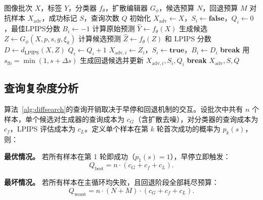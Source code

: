 \documentclass[type=bachelor,oneside]{fduthesis}
\newcommand{\methodname}{\textsc{DiffSearch}}
\begin{document}
\begin{algorithm}[H]
  \caption{\methodname：扩散式候选搜索攻击}
  \label{alg:diffsearch}
  \begin{algorithmic}[1]
    \Require 图像批次 $X$，标签 $Y$，分类器 $f_\theta$，扩散编辑器 $G_\phi$，候选预算 $N$，回退预算 $M$
    \Ensure 对抗样本 $X_{\text{adv}}$，成功标记 $S$，查询次数 $Q$
    \State 初始化 $X_{\text{adv}}\gets X$，$S_i\gets \textbf{false}$，$Q_i\gets 0$，最佳LPIPS分数 $B_i\gets -1$
    \State 计算原始预测 $\hat{Y}\gets f_\theta(X)$
      \State 生成候选 $Z\gets G_\phi(X,p,s,g,\xi_k)$
      \State 计算候选预测 $\hat{Z}\gets f_\theta(Z)$ 和 LPIPS 分数 $D\gets d_{\text{LPIPS}}(X,Z)$
        \State $Q_i\gets Q_i+1$
          \State $X_{\text{adv},i}\gets Z_i$，$S_i\gets \textbf{true}$，$B_i\gets D_i$
        \EndIf
      \EndFor
        \State \textbf{break}
      \EndIf
    \EndFor
        \State 用 $s_{\text{fb}}=\min(1,s+\Delta s)$ 生成回退候选并更新 $X_{\text{adv},i},S_i,Q_i$
          \State \textbf{break}
        \EndIf
      \EndFor
    \EndFor
    \State \Return $X_{\text{adv}},S,Q$
  \end{algorithmic}
\end{algorithm}

\subsection{查询复杂度分析}

算法~\ref{alg:diffsearch}的查询开销取决于早停和回退机制的交互。设批次中共有 $n$ 个样本，单个候选对生成器的查询成本为 $c_G$（含扩散去噪），对分类器的查询成本为 $c_f$，LPIPS 评估成本为 $c_L$。定义单个样本在第 $k$ 轮首次成功的概率为 $p_k(s)$，则：

\textbf{最优情况。} 若所有样本在第 1 轮即成功（$p_1(s) = 1$），早停立即触发：
\begin{equation}
  Q_{\text{best}} = n \cdot (c_G + c_f + c_L).
  \label{eq:query_best}
\end{equation}

\textbf{最坏情况。} 若所有样本在主循环均失败，且回退阶段全部耗尽预算：
\begin{equation}
  Q_{\text{worst}} = n \cdot (N + M) \cdot (c_G + c_f + c_L).
  \label{eq:query_worst}
\end{equation}
\end{document}
